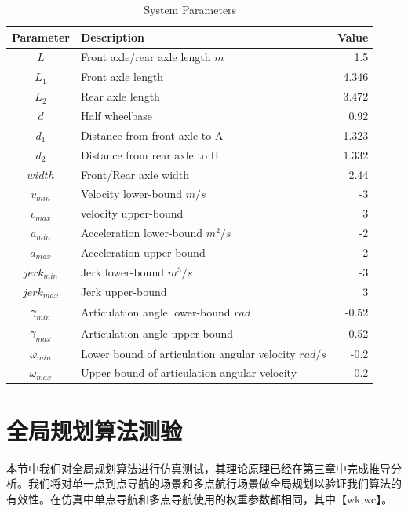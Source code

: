 \documentclass[master,academic]{ysuthesis} %
\begin{document}
	\begin{table}[!ht]
		\caption{System Parameters}
		\label{tab_para1}
		\centering
		\begin{tabular}{CLR}
			\toprule
			Parameter & Description & Value \\
			\midrule
			$L$ &Front axle/rear axle length $m$ &1.5\\			
			$L_1$ &Front axle length  &4.346\\			
			$L_2$ & Rear axle length &3.472\\			
			$d$   &Half wheelbase  &0.92\\		
			$d_1$ &Distance from front axle to A &1.323\\			
			$d_2$ &Distance from rear axle to H  &1.332\\			
			$width$ &Front/Rear axle width  &2.44\\			
			$v_{min}$ &Velocity lower-bound $m/s$ &-3\\			
			$v_{max}$ &velocity upper-bound  &3\\			
			$a_{min}$ &Acceleration lower-bound $m^2/s$ &-2\\			
			$a_{max}$ &Acceleration upper-bound &2\\			
			$jerk_{min}$ &Jerk lower-bound $m^3/s$ &-3\\			
			$jerk_{max}$ &Jerk upper-bound &3\\
			$\gamma_{min}$ &Articulation angle lower-bound $rad$ &-0.52\\
			$\gamma_{max}$ &Articulation angle upper-bound &0.52\\
			$\omega_{min}$ &Lower bound of articulation angular velocity $rad/s$ &-0.2\\
			$\omega_{max}$ &Upper bound of articulation angular velocity &0.2\\
			\bottomrule
		\end{tabular}
	\end{table}

	\section{全局规划算法测验}
	本节中我们对全局规划算法进行仿真测试，其理论原理已经在第三章中完成推导分析。我们将对单一点到点导航的场景和多点航行场景做全局规划以验证我们算法的有效性。在仿真中单点导航和多点导航使用的权重参数都相同，其中【wk,wc】。
\end{document}
